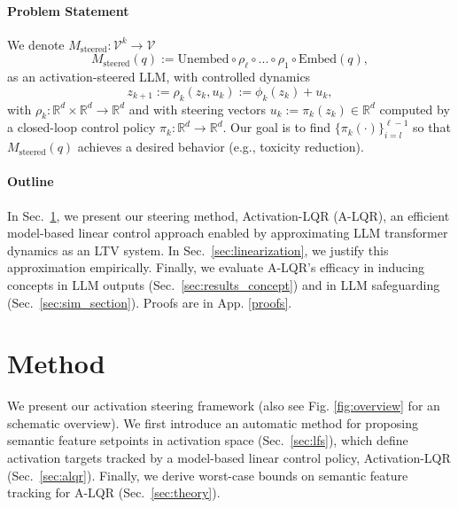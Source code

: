 \documentclass{article}
\newcommand{\bR}{\mathbb{R}}
\newcommand{\mc}{\mathcal}
\theoremstyle{plain}
\theoremstyle{definition}
\theoremstyle{remark}
\begin{document}
\paragraph{Problem Statement} We denote $M_\text{steered}: \mc V^k \rightarrow \mc V$
\begin{equation}\label{steered_model}
    M_\text{steered}(q) := \text{Unembed}\circ \rho_\ell \circ ... \circ \rho_1 \circ \text{Embed}(q),
\end{equation}
as an activation-steered LLM, with controlled dynamics
\begin{equation}\label{steered_transformer}
    z_{k+1} := \rho_k(z_k, u_k) := \phi_k(z_k) + u_k,
\end{equation}
with $\rho_k: \bR^{d} \times \bR^{d}\rightarrow \bR^{d}$ and with steering vectors $u_k := \pi_k(z_k) \in \bR^d$ computed by a closed-loop control policy $\pi_k: \bR^d \rightarrow \bR^d$. Our goal is to find $\{\pi_k(\cdot)\}_{i=l}^{\ell-1}$ so that $M_{\text{steered}}(q)$ achieves a desired behavior (e.g., toxicity reduction).

\vspace{-8pt}
\paragraph{Outline}
In Sec.~\ref{sec:method}, we present our steering method, Activation-LQR (A-LQR), an efficient model-based linear control approach enabled by approximating LLM transformer dynamics as an LTV system. In Sec.~\ref{sec:linearization}, we justify this approximation empirically. Finally, we evaluate A-LQR’s efficacy in inducing concepts in LLM outputs (Sec.~\ref{sec:results_concept}) and in LLM safeguarding (Sec.~\ref{sec:sim_section}). Proofs are in App. \ref{proofs}. 

\section{Method}\label{sec:method}
We present our activation steering framework (also see Fig. \ref{fig:overview} for an schematic overview). We first introduce an automatic method for proposing semantic feature setpoints in activation space (Sec.~\ref{sec:lfs}), which define activation targets tracked by a model-based linear control policy, Activation-LQR (Sec.~\ref{sec:alqr}). Finally, we derive worst-case bounds on semantic feature tracking for A-LQR (Sec.~\ref{sec:theory}).
\end{document}

